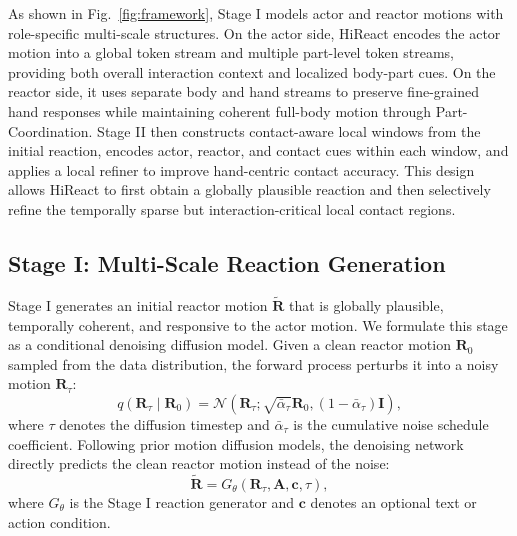 \documentclass{article}
\begin{document}
As shown in Fig.~\ref{fig:framework}, Stage I models actor and reactor motions with role-specific multi-scale structures. On the actor side, HiReact encodes the actor motion into a global token stream and multiple part-level token streams, providing both overall interaction context and localized body-part cues. On the reactor side, it uses separate body and hand streams to preserve fine-grained hand responses while maintaining coherent full-body motion through Part-Coordination. Stage II then constructs contact-aware local windows from the initial reaction, encodes actor, reactor, and contact cues within each window, and applies a local refiner to improve hand-centric contact accuracy. This design allows HiReact to first obtain a globally plausible reaction and then selectively refine the temporally sparse but interaction-critical local contact regions.

\subsection{Stage I: Multi-Scale Reaction Generation}
Stage I generates an initial reactor motion $\widetilde{\mathbf{R}}$ that is globally plausible, temporally coherent, and responsive to the actor motion. We formulate this stage as a conditional denoising diffusion model. Given a clean reactor motion $\mathbf{R}_{0}$ sampled from the data distribution, the forward process perturbs it into a noisy motion $\mathbf{R}_{\tau}$:
\begin{equation}
q(\mathbf{R}_{\tau}\mid \mathbf{R}_{0})
=
\mathcal{N}
\left(
\mathbf{R}_{\tau};
\sqrt{\bar{\alpha}_{\tau}}\mathbf{R}_{0},
(1-\bar{\alpha}_{\tau})\mathbf{I}
\right),
\end{equation}
where $\tau$ denotes the diffusion timestep and $\bar{\alpha}_{\tau}$ is the cumulative noise schedule coefficient. Following prior motion diffusion models, the denoising network directly predicts the clean reactor motion instead of the noise:
\begin{equation}
\widetilde{\mathbf{R}}
=
G_{\theta}
\left(
\mathbf{R}_{\tau},
\mathbf{A},
\mathbf{c},
\tau
\right),
\end{equation}
where $G_{\theta}$ is the Stage I reaction generator and $\mathbf{c}$ denotes an optional text or action condition.
\end{document}
